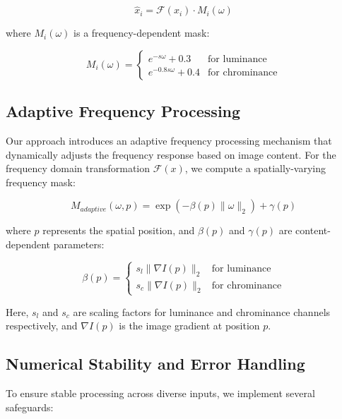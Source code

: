 \documentclass{article}
\begin{document}
\begin{equation}
\hat{x}_i = \mathcal{F}(x_i) \cdot M_i(\omega)
\end{equation}

where $M_i(\omega)$ is a frequency-dependent mask:

\begin{equation}
M_i(\omega) = \begin{cases}
e^{-s\omega} + 0.3 & \text{for luminance} \\
e^{-0.8s\omega} + 0.4 & \text{for chrominance}
\end{cases}
\end{equation}

\subsection{Adaptive Frequency Processing}
Our approach introduces an adaptive frequency processing mechanism that dynamically adjusts the frequency response based on image content. For the frequency domain transformation $\mathcal{F}(x)$, we compute a spatially-varying frequency mask:

\begin{equation}
M_{adaptive}(\omega, p) = \exp(-\beta(p)\|\omega\|_2) + \gamma(p)
\end{equation}

where $p$ represents the spatial position, and $\beta(p)$ and $\gamma(p)$ are content-dependent parameters:

\begin{equation}
\beta(p) = \begin{cases}
s_l\|∇I(p)\|_2 & \text{for luminance} \\
s_c\|∇I(p)\|_2 & \text{for chrominance}
\end{cases}
\end{equation}

Here, $s_l$ and $s_c$ are scaling factors for luminance and chrominance channels respectively, and $∇I(p)$ is the image gradient at position $p$.

\subsection{Numerical Stability and Error Handling}
To ensure stable processing across diverse inputs, we implement several safeguards:
\end{document}

